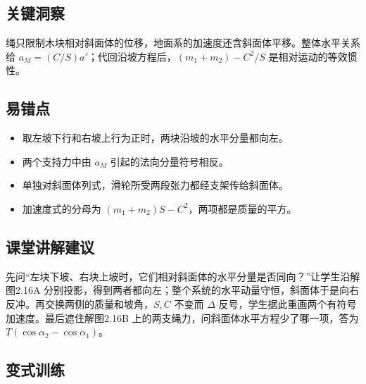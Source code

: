 \documentclass[UTF8,fontset=fandol,a4paper,11pt]{ctexart}
\begin{document}


\subsection*{关键洞察}

绳只限制木块相对斜面体的位移，地面系的加速度还含斜面体平移。整体水平关系给 $a_M=(C/S)a'$；代回沿坡方程后，$(m_1+m_2)-C^2/S$ 是相对运动的等效惯性。



\subsection*{易错点}

\begin{itemize}
\item 取左坡下行和右坡上行为正时，两块沿坡的水平分量都向左。
\item 两个支持力中由 $a_M$ 引起的法向分量符号相反。
\item 单独对斜面体列式，滑轮所受两段张力都经支架传给斜面体。
\item 加速度式的分母为 $(m_1+m_2)S-C^2$，两项都是质量的平方。
\end{itemize}



\subsection*{课堂讲解建议}

先问“左块下坡、右块上坡时，它们相对斜面体的水平分量是否同向？”让学生沿解图2.16A 分别投影，得到两者都向左；整个系统的水平动量守恒，斜面体于是向右反冲。再交换两侧的质量和坡角，$S,C$ 不变而 $\Delta$ 反号，学生据此重画两个有符号加速度。最后遮住解图2.16B 上的两支绳力，问斜面体水平方程少了哪一项，答为 $T(\cos\alpha_2-\cos\alpha_1)$。



\subsection*{变式训练}
\end{document}

